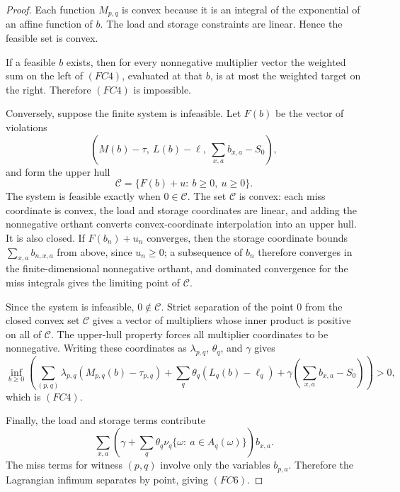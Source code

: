 \documentclass[10pt]{article}
\theoremstyle{definition}
\begin{document}
\begin{proof}
   Each function \(M_{p,q}\) is convex because it is an integral of the
   exponential of an affine function of \(b\).  The load and storage
   constraints are linear.  Hence the feasible set is convex.

   If a feasible \(b\) exists, then for every nonnegative multiplier vector the
   weighted sum on the left of \((FC4)\), evaluated at that \(b\), is at most
   the weighted target on the right.  Therefore \((FC4)\) is impossible.

   Conversely, suppose the finite system is infeasible.  Let \(F(b)\) be the
   vector of violations
   \[
      \left(M(b)-\tau,\ L(b)-\ell,\ \sum_{x,a}b_{x,a}-S_0\right),
   \]
   and form the upper hull
   \[
      \mathcal C=\{F(b)+u:\ b\ge0,\ u\ge0\}.
   \]
   The system is feasible exactly when \(0\in\mathcal C\).  The set
   \(\mathcal C\) is convex: each miss coordinate is convex, the load and
   storage coordinates are linear, and adding the nonnegative orthant converts
   convex-coordinate interpolation into an upper hull.  It is also closed.  If
   \(F(b_n)+u_n\) converges, then the storage coordinate bounds
   \(\sum_{x,a}b_{n,x,a}\) from above, since \(u_n\ge0\); a subsequence of
   \(b_n\) therefore converges in the finite-dimensional nonnegative orthant,
   and dominated convergence for the miss integrals gives the limiting point of
   \(\mathcal C\).

   Since the system is infeasible, \(0\notin\mathcal C\).  Strict separation of
   the point \(0\) from the closed convex set \(\mathcal C\) gives a vector of
   multipliers whose inner product is positive on all of \(\mathcal C\).  The
   upper-hull property forces all multiplier coordinates to be nonnegative.
   Writing these coordinates as \(\lambda_{p,q}\), \(\theta_q\), and \(\gamma\)
   gives
   \[
      \inf_{b\ge0}
      \left(
      \sum_{(p,q)}\lambda_{p,q}(M_{p,q}(b)-\tau_{p,q})
      +\sum_q\theta_q(L_q(b)-\ell_q)
      +\gamma\left(\sum_{x,a}b_{x,a}-S_0\right)
      \right)>0,
   \]
   which is \((FC4)\).

   Finally, the load and storage terms contribute
   \[
      \sum_{x,a}
      \left(
         \gamma+
         \sum_q\theta_q\nu_q\{\omega:\ a\in A_q(\omega)\}
      \right)b_{x,a}.
   \]
   The miss terms for witness \((p,q)\) involve only the variables
   \(b_{p,a}\).  Therefore the Lagrangian infimum separates by point, giving
   \((FC6)\).
\end{proof}
\end{document}
